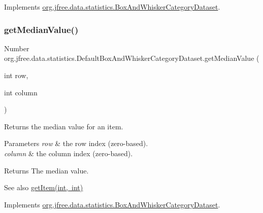 Implements \mbox{\hyperlink{interfaceorg_1_1jfree_1_1data_1_1statistics_1_1_box_and_whisker_category_dataset_adaff6be1d6511f25dcc8c74496541262}{org.\+jfree.\+data.\+statistics.\+Box\+And\+Whisker\+Category\+Dataset}}.

\mbox{\label{classorg_1_1jfree_1_1data_1_1statistics_1_1_default_box_and_whisker_category_dataset_a71fe367beb1408e129204aa19fa5502b}} 
\subsubsection{\texorpdfstring{get\+Median\+Value()}{getMedianValue()}\hspace{0.1cm}{\footnotesize\ttfamily [1/2]}}
{\footnotesize\ttfamily Number org.\+jfree.\+data.\+statistics.\+Default\+Box\+And\+Whisker\+Category\+Dataset.\+get\+Median\+Value (\begin{DoxyParamCaption}\item[{int}]{row,  }\item[{int}]{column }\end{DoxyParamCaption})}

Returns the median value for an item.


\begin{DoxyParams}{Parameters}
{\em row} & the row index (zero-\/based). \\
\hline
{\em column} & the column index (zero-\/based).\\
\hline
\end{DoxyParams}
\begin{DoxyReturn}{Returns}
The median value.
\end{DoxyReturn}
\begin{DoxySeeAlso}{See also}
\mbox{\hyperlink{classorg_1_1jfree_1_1data_1_1statistics_1_1_default_box_and_whisker_category_dataset_a85c944b06e4337059ea728b3a744e2a9}{get\+Item(int, int)}} 
\end{DoxySeeAlso}


Implements \mbox{\hyperlink{interfaceorg_1_1jfree_1_1data_1_1statistics_1_1_box_and_whisker_category_dataset_a0744eb012274b3be674933d67474ed65}{org.\+jfree.\+data.\+statistics.\+Box\+And\+Whisker\+Category\+Dataset}}.


